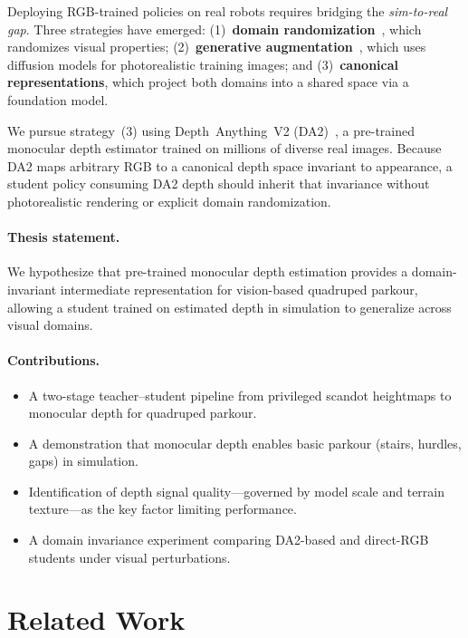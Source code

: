 \documentclass[10pt,twocolumn]{article}
\begin{document}
Deploying RGB-trained policies on real robots requires bridging the \emph{sim-to-real gap}.
Three strategies have emerged: (1)~\textbf{domain randomization}~\citep{tobin2017domain}, which randomizes visual properties; (2)~\textbf{generative augmentation}~\citep{yu2024lucidsim}, which uses diffusion models for photorealistic training images; and (3)~\textbf{canonical representations}, which project both domains into a shared space via a foundation model.

We pursue strategy~(3) using Depth~Anything~V2 (DA2)~\citep{yang2024depth}, a pre-trained monocular depth estimator trained on millions of diverse real images.
Because DA2 maps arbitrary RGB to a canonical depth space invariant to appearance, a student policy consuming DA2 depth should inherit that invariance without photorealistic rendering or explicit domain randomization.

\paragraph{Thesis statement.}
We hypothesize that pre-trained monocular depth estimation provides a
domain-invariant intermediate representation for vision-based quadruped
parkour, allowing a student trained on estimated depth in simulation to
generalize across visual domains.

\paragraph{Contributions.}
\begin{itemize}[nosep,leftmargin=*]
  \item A two-stage teacher--student pipeline from privileged scandot
    heightmaps to monocular depth for quadruped parkour.
  \item A demonstration that monocular depth enables basic parkour (stairs, hurdles, gaps) in simulation.
  \item Identification of depth signal quality---governed by
    model scale and terrain texture---as the key factor limiting performance.
  \item A domain invariance experiment comparing DA2-based and direct-RGB students under visual perturbations.
\end{itemize}


\section{Related Work}
\label{sec:related}
\end{document}
